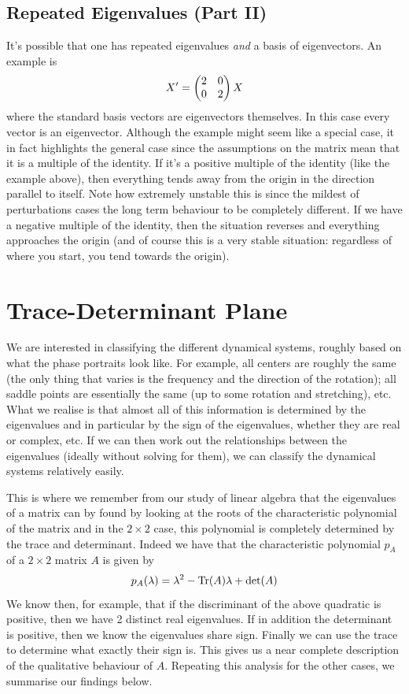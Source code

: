 
\subsection{Repeated Eigenvalues (Part II)}
It's possible that one has repeated eigenvalues \textit{and} a basis of eigenvectors. An example is
\begin{equation}
    X' = \begin{pmatrix} 2 & 0 \\ 0 & 2 \end{pmatrix} X
\end{equation}
where the standard basis vectors are eigenvectors themselves. In this case every vector is an eigenvector. Although the example might seem like a special case, it in fact highlights the general case since the assumptions on the matrix mean that it is a multiple of the identity. If it's a positive multiple of the identity (like the example above), then everything tends away from the origin in the direction parallel to itself. Note how extremely unstable this is since the mildest of perturbations cases the long term behaviour to be completely different. If we have a negative multiple of the identity, then the situation reverses and everything approaches the origin (and of course this is a very stable situation: regardless of where you start, you tend towards the origin).


\section{Trace-Determinant Plane}
We are interested in classifying the different dynamical systems, roughly based on what the phase portraits look like. For example, all centers are roughly the same (the only thing that varies is the frequency and the direction of the rotation); all saddle points are essentially the same (up to some rotation and stretching), etc. What we realise is that almost all of this information is determined by the eigenvalues and in particular by the sign of the eigenvalues, whether they are real or complex, etc. If we can then work out the relationships between the eigenvalues (ideally without solving for them), we can classify the dynamical systems relatively easily.

This is where we remember from our study of linear algebra that the eigenvalues of a matrix can by found by looking at the roots of the characteristic polynomial of the matrix and in the $2 \times 2$ case, this polynomial is completely determined by the trace and determinant. Indeed we have that the characteristic polynomial $p_A$ of a $2 \times 2$ matrix $A$ is given by
$$ p_A(\lambda) = \lambda^2 - \mathrm{Tr}(A)\lambda + \det(A) $$
We know then, for example, that if the discriminant of the above quadratic is positive, then we have 2 distinct real eigenvalues. If in addition the determinant is positive, then we know the eigenvalues share sign. Finally we can use the trace to determine what exactly their sign is. This gives us a near complete description of the qualitative behaviour of $A$. Repeating this analysis for the other cases, we summarise our findings below.


